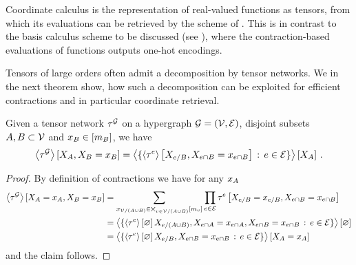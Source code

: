 Coordinate calculus is the representation of real-valued functions as tensors, from which its evaluations can be retrieved by the scheme of .
This is in contrast to the basis calculus scheme to be discussed (see ), where the contraction-based evaluations of functions outputs one-hot encodings.

Tensors of large orders often admit a decomposition by tensor networks.
We in the next theorem show, how such a decomposition can be exploited for efficient contractions and in particular coordinate retrieval.

\begin{theorem}
    \label{the:slicedContractionToCores}
    Given a tensor network $\tau^{\mathcal{G}}$ on a hypergraph $\mathcal{G}=(\mathcal{V},\mathcal{E})$, disjoint subsets $A,B\subset\mathcal{V}$ and $x_{B}\in[m_{B}]$, we have
    \begin{align*}
        \left\langle \tau^{\mathcal{G}}\right\rangle \left[ X_{A},X_{B}=x_{B} \right]
        = \left\langle 
            \{\left\langle \tau^{e}\right\rangle \left[ X_{e/B},X_{e\cap B}=x_{e\cap B} \right] \,:\, e\in\mathcal{E} \}
        \right\rangle \left[ X_{A} \right] \, .
    \end{align*}
\end{theorem}
\begin{proof}
    By definition of contractions we have for any $x_{A}$
    \begin{align*}
        \left\langle \tau^{\mathcal{G}}\right\rangle \left[ X_{A}=x_{A},X_{B}=x_{B} \right]
        &= \sum_{x_{\mathcal{V}/(A\cup B)}\in\bigtimes_{v\in\mathcal{V}/(A\cup B)}[m_{v}]} \prod_{e\in\mathcal{E}} \tau^{e}\left[X_{e/B}=x_{e/B},X_{e\cap B}=x_{e\cap B}\right] \\
        &= \left\langle 
            \{\left\langle \tau^{e}\right\rangle \left[ \varnothing \right]{X_{e/(A\cup B)},X_{e\cap A}=x_{e\cap A},X_{e\cap B}=x_{e\cap B}} \,:\, e\in\mathcal{E} \}
        \right\rangle \left[ \varnothing \right] \\
        &= \left\langle 
            \{\left\langle \tau^{e}\right\rangle \left[ \varnothing \right]{X_{e/B},X_{e\cap B}=x_{e\cap B}} \,:\, e\in\mathcal{E} \}
        \right\rangle \left[ X_{A}=x_{A} \right]
    \end{align*}
    and the claim follows.
\end{proof}


